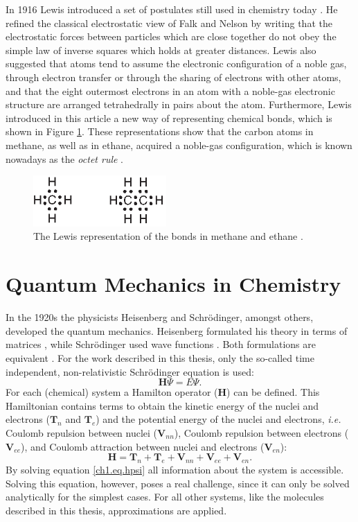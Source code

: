 In 1916 Lewis introduced a set of postulates still used in chemistry today \cite{lewis}. He refined the classical electrostatic view of Falk and Nelson by writing that the electrostatic forces between particles which are close together do not obey the simple law of inverse squares which holds at greater distances. Lewis also suggested that atoms tend to assume the electronic configuration of a noble gas, through electron transfer or through the sharing of electrons with other atoms, and that the eight outermost electrons in an atom with a noble-gas electronic structure are arranged tetrahedrally in pairs about the atom. Furthermore, Lewis introduced in this article a new way of representing chemical bonds, which is shown in Figure \ref{ch1.fig2}. These representations show that the carbon atoms in methane, as well as in ethane, acquired a noble-gas configuration, which is known nowadays as the \textit{octet rule} \cite{bruice}.
\begin{figure}[htp]
\center
\includegraphics[width=2in]{introduction/figures/figure2.eps}
\caption{The Lewis representation of the bonds in methane and ethane \cite{lewis}.}
\label{ch1.fig2}
\end{figure}

\section{Quantum Mechanics in Chemistry}

In the 1920s the physicists Heisenberg and Schr\"{o}dinger, amongst others, developed the quantum mechanics. Heisenberg formulated his theory in terms of matrices \cite{heisenberg}, while Schr\"{o}dinger used wave functions \cite{schrodinger1,schrodinger2}. Both formulations are equivalent \cite{schrodinger3}. For the work described in this thesis, only the so-called time independent, non-relativistic Schr\"{o}dinger equation is used:
\begin{equation}
\mathbf{H} \Psi=E \Psi.
\label{ch1.eq.hpsi}
\end{equation}
For each (chemical) system a Hamilton operator ($\mathbf{H}$) can be defined. This Hamiltonian contains terms to obtain the kinetic energy of the nuclei and electrons ($\mathbf{T}_n$ and $\mathbf{T}_e$) and the potential energy of the nuclei and electrons, \textit{i.e.} Coulomb repulsion between nuclei ($\mathbf{V}_{nn}$), Coulomb repulsion between electrons ($\mathbf{V}_{ee}$), and Coulomb attraction between nuclei and electrons ($\mathbf{V}_{en}$):
\begin{equation}
\mathbf{H} = \mathbf{T}_n + \mathbf{T}_e + \mathbf{V}_{nn} + \mathbf{V}_{ee} + \mathbf{V}_{en}.
\label{ch1.eq.htotal}
\end{equation}
By solving equation \ref{ch1.eq.hpsi} all information about the system is accessible. Solving this equation, however, poses a real challenge, since it can only be solved analytically for the simplest cases. For all other systems, like the molecules described in this thesis, approximations are applied.

